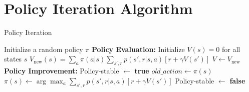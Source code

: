 \documentclass{article}
\begin{document}
\section*{Policy Iteration Algorithm}

\begin{algorithm}
\caption{Policy Iteration}
\label{alg:policy_iteration}
\begin{algorithmic}[1]
\STATE Initialize a random policy $\pi$
\REPEAT
    \STATE \textbf{Policy Evaluation:}
    \STATE Initialize $V(s) = 0$ for all states $s$
    \REPEAT
            \STATE $V_{\text{new}}(s) = \sum_{a} \pi(a|s) \sum_{s', r} p(s', r|s, a)[r + \gamma V(s')]$
        \ENDFOR
        \STATE $V \leftarrow V_{\text{new}}$
    \STATE \textbf{Policy Improvement:}
    \STATE Policy-stable $\leftarrow$ \textbf{true}
        \STATE $old\_action \leftarrow \pi(s)$
        \STATE $\pi(s) \leftarrow \arg\max_{a} \sum_{s', r} p(s', r|s, a)[r + \gamma V(s')]$
            \STATE Policy-stable $\leftarrow$ \textbf{false}
        \ENDIF
    \ENDFOR
{}
\end{algorithmic}
\end{algorithm}
\end{document}

